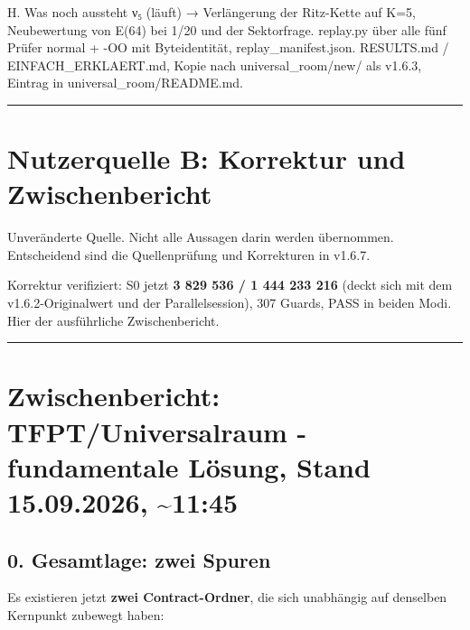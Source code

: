 H. Was noch aussteht ν₅ (läuft) → Verlängerung der Ritz-Kette auf K=5,
Neubewertung von E(64) bei 1/20 und der Sektorfrage. replay.py über alle
fünf Prüfer normal + -OO mit Byteidentität, replay\_manifest.json.
RESULTS.md / EINFACH\_ERKLAERT.md, Kopie nach universal\_room/new/ als
v1.6.3, Eintrag in universal\_room/README.md.

\begin{center}\rule{0.5\linewidth}{0.5pt}\end{center}

\section{Nutzerquelle B: Korrektur und
Zwischenbericht}\label{nutzerquelle-b-korrektur-und-zwischenbericht}

Unveränderte Quelle. Nicht alle Aussagen darin werden übernommen.
Entscheidend sind die Quellenprüfung und Korrekturen in v1.6.7.

Korrektur verifiziert: S0 jetzt \textbf{3 829 536 / 1 444 233 216}
(deckt sich mit dem v1.6.2-Originalwert und der Parallelsession), 307
Guards, PASS in beiden Modi. Hier der ausführliche Zwischenbericht.

\begin{center}\rule{0.5\linewidth}{0.5pt}\end{center}

\section[Historischer Zwischenbericht vom 15.09.2026]{Zwischenbericht: TFPT/Universalraum - fundamentale Lösung,
Stand 15.09.2026,
\textasciitilde11:45}\label{zwischenbericht-tfptuniversalraum---fundamentale-luxf6sung-stand-15.09.2026-1145}

\subsection{0. Gesamtlage: zwei Spuren}\label{gesamtlage-zwei-spuren}

Es existieren jetzt \textbf{zwei Contract-Ordner}, die sich unabhängig
auf denselben Kernpunkt zubewegt haben:

